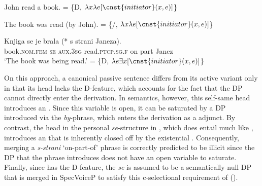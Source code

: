 \documentclass[output=paper,nonflat,newtxmath]{langsci/langscibook}
\begin{document}
\begin{exe}
\ex \begin{xlist} \label{ex:lenardic: 17}
\ex \label{ex:lenardic: 17a} John read a book.
\ex \label{ex:lenardic: 17b}  = \{D, $\lambda x\lambda e[\cnst{initiator}(x, e)]$\}
\end{xlist}
\ex \begin{xlist} \label{ex:lenardic: 18}
\ex \label{ex:lenardic: 18a} The book was read (by John).
\ex {} = \{/, $\lambda x\lambda e[\cnst{initiator}(x, e)]$\}
\end{xlist}
\ex \begin{xlist} \label{ex:lenardic: 19}
\ex \label{ex:lenardic: 19a} \gll Knjiga se je brala (*\hspace{-2pt} s strani Janeza).
\\
book.\textsc{nom}.\textsc{fem} \textsc{se} \textsc{aux}.\textsc{3sg} read.\textsc{ptcp.sg.f} {} on part Janez\\
\trans `The book was being read.'
\ex \label{ex:lenardic: 19b}  = \{D, $\lambda e\exists x[\cnst{initiator}(x, e)]$\}
\end{xlist}
\end{exe}

\noindent On this approach, a canonical passive sentence  differs from its active variant  only in that its  head lacks the D-feature, which accounts for the fact that the  DP cannot directly enter the derivation. In semantics, however, this self-same  head introduces an . Since this variable is open, it can be saturated  by a DP introduced  via the \textit{by}-phrase, which enters the derivation as a  adjunct. By contrast, the  head in the personal \textit{se}-structure in , which does entail  much like , introduces an  that is inherently closed off by the existential . Consequently, merging a \textit{s-strani} `on-part-of' phrase is correctly predicted to be illicit since the  DP that the phrase introduces does not have an open variable to saturate.  Finally, since  has the D-feature, the \textit{se}  is assumed to be a semantically-null DP that is merged in SpecVoiceP to satisfy this c-selectional requirement of  (\citealt{schaffer2017}).
\end{document}
